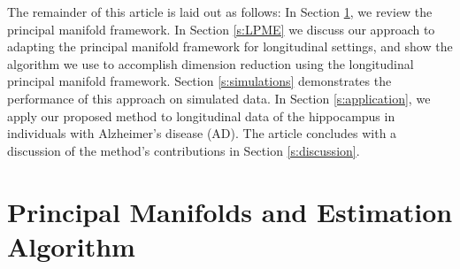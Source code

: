 \documentclass[11pt,reqno]{article}
\theoremstyle{definition}
\begin{document}
The remainder of this article is laid out as follows: In Section \ref{s:PME}, we review the principal manifold framework. In Section \ref{s:LPME} we discuss our approach to adapting the principal manifold framework for longitudinal settings, and show the algorithm we use to accomplish dimension reduction using the longitudinal principal manifold framework. Section \ref{s:simulations} demonstrates the performance of this approach on simulated data. In Section \ref{s:application}, we apply our proposed method to longitudinal data of the hippocampus in individuals with Alzheimer's disease (AD). The article concludes with a discussion of the method's contributions in Section \ref{s:discussion}.








\section{Principal Manifolds and Estimation Algorithm}\label{s:PME}
\end{document}
